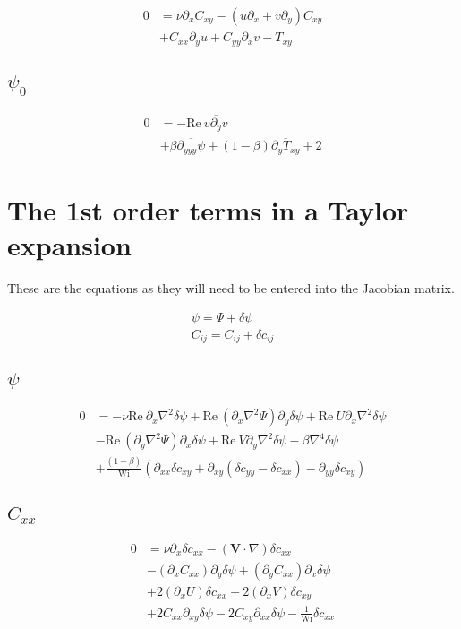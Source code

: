 \documentclass[12,a4paper]{article}
\newcommand{\dd}[1]{\partial_{#1}}
\newcommand{\lpl}{\nabla^{2}}
\newcommand{\bih}{\nabla^{4}}
\newcommand{\scij}{\delta c_{ij}}
\newcommand{\scxx}{\delta c_{xx}}
\newcommand{\scyy}{\delta c_{yy}}
\newcommand{\scxy}{\delta c_{xy}}
\newcommand{\spsi}{\delta \psi}
\newcommand{\Wi}{\mathrm{Wi}}
\newcommand{\Rey}{\mathrm{Re \ }}
\begin{document}
\begin{align}
    0 &= \nu \dd{x} C_{xy} - (u\dd{x} + v\dd{y}) C_{xy} \nonumber\\
    &+ C_{xx} \dd{y}u + C_{yy}\dd{x}v - T_{xy}
\end{align}

\subsection{$\psi_{0}$}

\begin{align}
    0 &= - \Rey \overline{v\dd{y}v} \nonumber\\
    &+ \beta \overline{\dd{yyy}\psi} + (1-\beta)\overline{\dd{y}T_{xy}} + 2
\end{align}

\section{The 1st order terms in a Taylor expansion}

These are the equations as they will need to be entered into the Jacobian matrix.

\begin{align}
\psi = \Psi + \spsi \\
C_{ij} = C_{ij} +\scij
\end{align}

\subsection{$\psi$}

\begin{align}
    0 &= - \nu\Rey\dd{x}\lpl\spsi +  \Rey (\dd{x}\lpl\Psi) \dd{y}\spsi + \Rey U \dd{x}\lpl \spsi \nonumber\\
    &- \Rey (\dd{y}\lpl \Psi) \dd{x} \spsi + \Rey V \dd{y} \lpl \spsi - \beta \bih \spsi \nonumber\\
    &+ \frac{(1-\beta)}{\Wi} \left( \dd{xx} \scxy +\dd{xy} (\scyy -\scxx) - \dd{yy} \scxy \right)
\end{align}

\subsection{$C_{xx}$}

\begin{align}
    0 &= \nu \dd{x} \scxx - (\mathbf{V}\cdot \nabla) \scxx \nonumber \\
    &- (\dd{x}C_{xx})\dd{y}\spsi + (\dd{y}C_{xx})\dd{x} \spsi \nonumber\\
    &+ 2(\dd{x} U) \scxx + 2(\dd{x} V) \scxy \nonumber\\
    &+ 2C_{xx}\dd{xy} \spsi - 2C_{xy}\dd{xx}\spsi - \frac{1}{\Wi}\scxx
\end{align}
\end{document}
